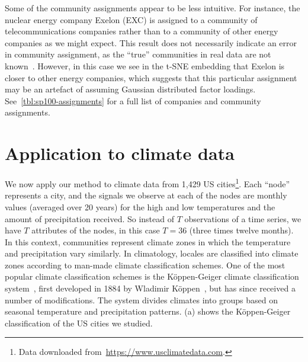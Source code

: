 \documentclass[onecolumn,pre,superscriptaddress, longbibliography, nofootinbib, notitlepage]{revtex4-1}
\begin{document}
Some of the community assignments appear to be less intuitive. For instance, the nuclear energy company Exelon (EXC) is assigned to a community of telecommunications companies rather than to a community of other energy companies as we might expect. This result does not necessarily indicate an error in community assignment, as the ``true'' communities in real data are not known~\cite{Peel2017}. However, in this case we see in the t-SNE embedding that Exelon is closer to other energy companies, which suggests that this particular assignment may be an artefact of assuming Gaussian distributed factor loadings. See~\cref{tbl:sp100-assignments} for a full list of companies and community assignments.

\section{\label{sec:application2} Application to climate data}

We now apply our method to climate data from 1,429 US cities\footnote{Data downloaded from~\url{https://www.usclimatedata.com}.}. Each ``node'' represents a city, and the signals we observe at each of the nodes are monthly values (averaged over 20 years) for the high and low temperatures and the amount of precipitation received. So instead of $T$ observations of a time series, we have $T$ attributes of the nodes, in this case $T=36$ (three times twelve months). In this context, communities represent climate zones in which the temperature and precipitation vary similarly. In climatology, locales are classified into climate zones according to man-made climate classification schemes. One of the most popular climate classification schemes is the K\"oppen-Geiger climate classification system~\cite{kottek2006world}, first developed in 1884 by Wladimir K\"oppen~\cite{koppen1884warmezonen}, but has since received a number of modifications. 
The system divides climates into groups based on seasonal temperature and precipitation patterns.  (a) shows the K\"oppen-Geiger classification of the US cities we studied.
\end{document}
